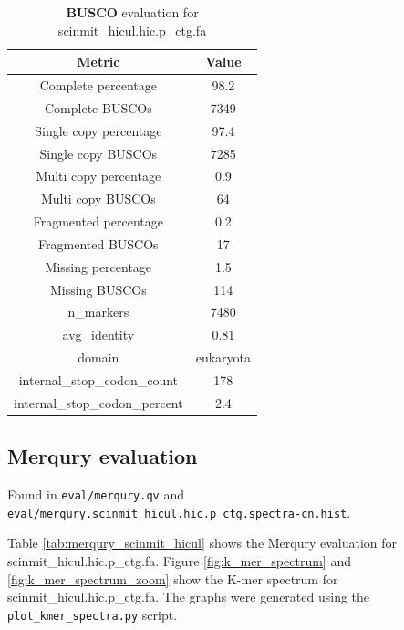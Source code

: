 \documentclass[12pt]{article}
\begin{document}
\begin{table}[h!]
    \begin{center}
    \begin{tabular}{ |c|c| }
        \hline
        Metric & Value \\
        \hline
        Complete percentage & 98.2 \\
        Complete BUSCOs & 7349 \\
        Single copy percentage & 97.4 \\
        Single copy BUSCOs & 7285 \\
        Multi copy percentage & 0.9 \\
        Multi copy BUSCOs & 64 \\
        Fragmented percentage & 0.2 \\
        Fragmented BUSCOs & 17 \\
        Missing percentage & 1.5 \\
        Missing BUSCOs & 114 \\
        n\_markers & 7480 \\
        avg\_identity & 0.81 \\
        domain & eukaryota \\
        internal\_stop\_codon\_count & 178 \\
        internal\_stop\_codon\_percent & 2.4 \\
        \hline
    \end{tabular}
    \caption{\textbf{BUSCO} evaluation for scinmit\_hicul.hic.p\_ctg.fa}
    \label{tab:busco_scinmit_hicul}
    \end{center}
    \end{table}

\subsection{Merqury evaluation}

Found in \texttt{eval/merqury.qv} and \texttt{eval/merqury.scinmit\_hicul.hic.p\_ctg.spectra-cn.hist}. 

Table \ref{tab:merqury_scinmit_hicul} shows the Merqury evaluation for scinmit\_hicul.hic.p\_ctg.fa.
Figure \ref{fig:k_mer_spectrum} and \ref{fig:k_mer_spectrum_zoom} show the K-mer spectrum for scinmit\_hicul.hic.p\_ctg.fa.
The graphs were generated using the \texttt{plot\_kmer\_spectra.py} script.
\end{document}

